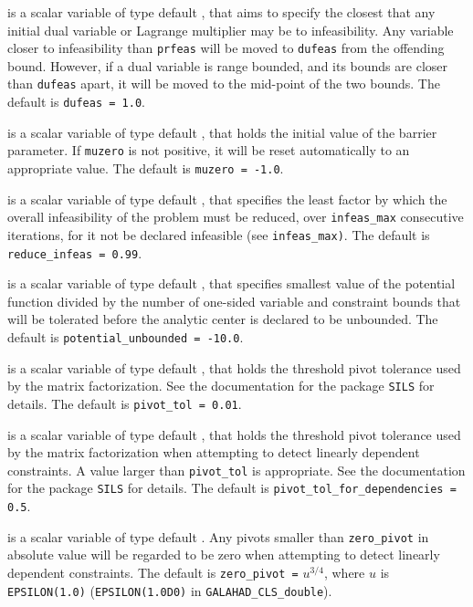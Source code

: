\documentclass{galahad}
\newcommand{\libraryname}{GALAHAD}
\newcommand{\packagename}{CLS}
\newcommand{\fullpackagename}{\libraryname\_\packagename}
\begin{document}
\begin{description}
 is a scalar variable of type default \realdp, that aims to specify
the closest that any initial dual variable or Lagrange multiplier may be to
infeasibility. Any variable closer to infeasibility than {\tt prfeas} will be
moved to {\tt dufeas} from the offending bound. However, if a dual variable
is range bounded, and its bounds are closer than {\tt dufeas} apart, it will
be moved to the mid-point of the two bounds.
The default is {\tt dufeas = 1.0}.

  is a scalar variable of type default \realdp, that holds the
initial value of the barrier parameter. If {\tt muzero} is
not positive, it will be reset automatically to an appropriate value.
The default is {\tt muzero = -1.0}.

  is a scalar variable of type default
\realdp, that specifies the
least factor by which the overall infeasibility of the problem must be reduced,
over {\tt infeas\_max} consecutive iterations,
for it not be declared infeasible (see {\tt infeas\_max)}.
The default is {\tt reduce\_infeas = 0.99}.

  is a scalar variable of type default
\realdp, that specifies smallest
value of the potential function divided by the number of one-sided variable and
constraint bounds that will be tolerated before the analytic center is
declared to be unbounded.
The default is {\tt potential\_u\-nbounded = -10.0}.

  is a scalar variable of type default
\realdp, that holds the
threshold pivot tolerance used by the matrix factorization.  See
the documentation for the package {\tt SILS} for details.
The default is {\tt pivot\_tol = 0.01}.

 is a scalar variable of type default
\realdp, that holds the
threshold pivot  tolerance used by the matrix factorization when
attempting to detect linearly dependent constraints. A value larger
than  {\tt pivot\_tol} is appropriate. See
the documentation for the package {\tt SILS} for details.
The default is {\tt pivot\_tol\_for\_dependencies = 0.5}.

 is a scalar variable of type default \realdp.
Any pivots smaller than  {\tt zero\_pivot} in absolute value will be regarded
to be zero when attempting to detect linearly dependent constraints.
The default is {\tt zero\_pivot =} $u^{3/4}$,
where $u$ is {\tt EPSILON(1.0)} ({\tt EPSILON(1.0D0)} in
{\tt \fullpackagename\_dou\-ble}).


\end{description}
\end{document}
